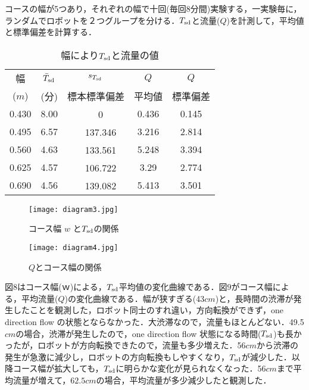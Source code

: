コースの幅が5つあり，それぞれの幅で十回(毎回8分間)実験する，一実験毎に，ランダムでロボットを２つグループを分ける．$T_{\rm sd}$と流量($Q$)を計測して，平均値と標準偏差を計算する．
\begin{table}[!ht]
\setlength\tabcolsep{1pt}
\begin{center}
\begin{tabular}{|c|c|c|c|c|}
\hline
幅& $\bar{T}_{\rm sd}$ & $s_{T_{\rm sd}}$ & $Q$ & $Q$ \\
($m$)   &  (分) & 標本標準偏差 & 平均値 & 標準偏差 \\
\hline
0.430 & 8.00 &　0 & 0.436 & 0.145 \\
\hline
0.495 & 6.57 &　137.346 & 3.216 & 2.814 \\
\hline
0.560 & 4.63 &　133.561 & 5.248 & 3.394 \\
\hline
0.625 & 4.57 &　106.722 & 3.29 & 2.774 \\
\hline
0.690 & 4.56 &　139.082 & 5.413 & 3.501 \\
\hline
\end{tabular}
\end{center}
\caption{
幅により$T_{\rm sd}$と流量の値
}
\end{table}
\vspace{-6mm}
\begin{figure}[!ht]
    \centering
    \texttt{[image: diagram3.jpg]}
    \caption{コース幅 $w$ と$T_{\rm sd}$の関係}
\end{figure}
\vspace{-6mm}
\begin{figure}[!ht]
    \centering
    \texttt{[image: diagram4.jpg]}
    \caption{$Q$とコース幅の関係}
\end{figure}

図$8$はコース幅($ｗ$)による，$T_{\rm sd}$平均値の変化曲線である．図$9$がコース幅による，平均流量($Q$)の変化曲線である．幅が狭すぎる(43$cm$)と，長時間の渋滞が発生したことを観測した，ロボット同士のすれ違い，方向転換ができず，one direction flow の状態とならなかった．大渋滞なので，流量もほとんどない．49.5$cm$の場合，渋滞が発生したので，one direction flow 状態になる時間($T_{\rm sd}$)も長かったが，ロボットが方向転換できたので，流量も多少増えた．56$cm$から渋滞の発生が急激に減少し，ロボットの方向転換もしやすくなり，$T_{\rm sd}$が減少した．以降コース幅が拡大しても，$T_{\rm sd}$に明らかな変化が見られなくなった．56$cm$まで平均流量が増えて，$62.5cm$の場合，平均流量が多少減少したと観測した．

